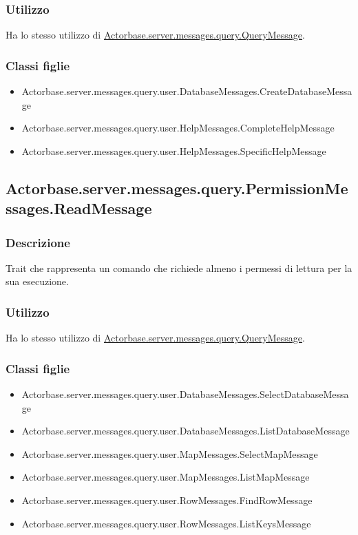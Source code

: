 \documentclass[a4paper]{article}
\begin{document}
			\subsubsection{Utilizzo}
				Ha lo stesso utilizzo di \hyperref[QueryMessage]{Actorbase.server.messages.query.QueryMessage}.
				
			\subsubsection{Classi figlie}
				\begin{itemize}
					\item Actorbase.server.messages.query.user.DatabaseMessages.CreateDatabaseMessage
					\item Actorbase.server.messages.query.user.HelpMessages.CompleteHelpMessage
					\item Actorbase.server.messages.query.user.HelpMessages.SpecificHelpMessage
				\end{itemize}
				
		\subsection{Actorbase.server.messages.query.PermissionMessages.ReadMessage}
			\subsubsection{Descrizione}
				Trait che rappresenta un comando che richiede almeno i permessi di lettura per la sua esecuzione.
				
			\subsubsection{Utilizzo}
				Ha lo stesso utilizzo di \hyperref[QueryMessage]{Actorbase.server.messages.query.QueryMessage}.
				
			\subsubsection{Classi figlie}
				\begin{itemize}
					\item Actorbase.server.messages.query.user.DatabaseMessages.SelectDatabaseMessage
					\item Actorbase.server.messages.query.user.DatabaseMessages.ListDatabaseMessage
					\item Actorbase.server.messages.query.user.MapMessages.SelectMapMessage
					\item Actorbase.server.messages.query.user.MapMessages.ListMapMessage
					\item Actorbase.server.messages.query.user.RowMessages.FindRowMessage
					\item Actorbase.server.messages.query.user.RowMessages.ListKeysMessage
				\end{itemize}
				
\end{document}
